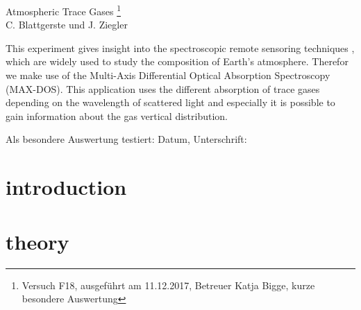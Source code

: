 \documentclass[12pt]{article}
\begin{document}
\thispagestyle{empty}
\null\vspace{40mm}
\begin{center}
{
\Large  Atmospheric Trace Gases
\footnote{\noindent Versuch F18, ausgeführt am 11.12.2017, Betreuer Katja Bigge, kurze besondere Auswertung}
}\\[15mm]

C. Blattgerste und J. Ziegler

\vspace{25mm}

\parbox{0.9\textwidth}{

\small  This experiment gives insight into the spectroscopic remote sensoring techniques
, which are widely used to study the composition of Earth's atmosphere.
Therefor we make use of the Multi-Axis Differential Optical Absorption Spectroscopy (MAX-DOS).
This application uses the different absorption of trace gases depending on the
wavelength of scattered light and especially it is possible to gain information about
the gas vertical distribution.
}
\end{center}

\vfill
Als besondere Auswertung testiert: Datum, Unterschrift:
\vspace{20mm}

\newpage
\null\thispagestyle{empty}

\newpage     %
\tableofcontents
{}
\newpage


\section{introduction}

\section{theory}
\end{document}
